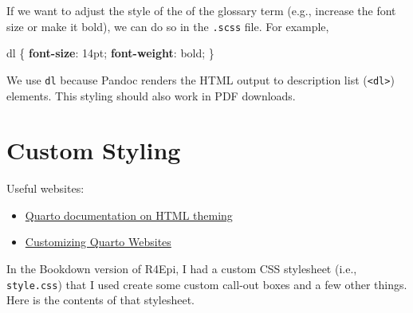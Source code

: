 \documentclass[
  letterpaper,
  DIV=11,
  numbers=noendperiod]{scrreprt}
\newenvironment{Shaded}{\begin{snugshade}}{\end{snugshade}}
\newcommand{\CharTok}[1]{\textcolor[rgb]{0.13,0.47,0.30}{#1}}
\newcommand{\DataTypeTok}[1]{\textcolor[rgb]{0.68,0.00,0.00}{#1}}
\newcommand{\DecValTok}[1]{\textcolor[rgb]{0.68,0.00,0.00}{#1}}
\newcommand{\KeywordTok}[1]{\textcolor[rgb]{0.00,0.23,0.31}{\textbf{#1}}}
\newcommand{\NormalTok}[1]{\textcolor[rgb]{0.00,0.23,0.31}{#1}}
\newcommand{\OperatorTok}[1]{\textcolor[rgb]{0.37,0.37,0.37}{#1}}
\providecommand{\tightlist}{%
  \setlength{\itemsep}{0pt}\setlength{\parskip}{0pt}}\usepackage{longtable,booktabs,array}
\begin{document}
If we want to adjust the style of the of the glossary term (e.g.,
increase the font size or make it bold), we can do so in the
\texttt{.scss} file. For example,

\begin{Shaded}
\begin{Highlighting}[]
\NormalTok{dl \{}
  \KeywordTok{font{-}size}\CharTok{:} \DecValTok{14}\DataTypeTok{pt}\OperatorTok{;}
  \KeywordTok{font{-}weight}\CharTok{:} \DecValTok{bold}\OperatorTok{;}
\NormalTok{\}}
\end{Highlighting}
\end{Shaded}

We use \texttt{dl} because Pandoc renders the HTML output to description
list (\texttt{\textless{}dl\textgreater{}}) elements. This styling
should also work in PDF downloads.

\chapter{Custom Styling}\label{sec-custom-styling}

Useful websites:

\begin{itemize}
\tightlist
\item
  \href{https://quarto.org/docs/output-formats/html-themes.html}{Quarto
  documentation on HTML theming}
\item
  \href{https://ucsb-meds.github.io/customizing-quarto-websites/\#/title-slide}{Customizing
  Quarto Websites}
\end{itemize}

In the Bookdown version of R4Epi, I had a custom CSS stylesheet (i.e.,
\texttt{style.css}) that I used create some custom call-out boxes and a
few other things. Here is the contents of that stylesheet.
\end{document}
